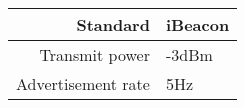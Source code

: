 
\begin{tabular}{r|l}
Standard          & iBeacon \\ \hline
Transmit power     & -3dBm \\ \hline
Advertisement rate & 5Hz \\ 
\end{tabular}
